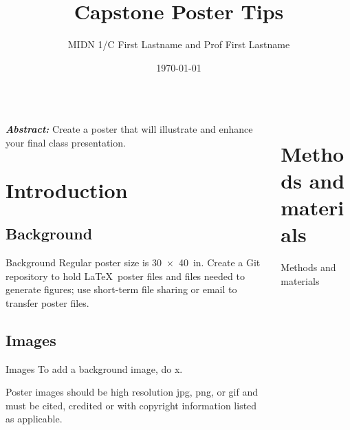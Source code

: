 \documentclass[pdf]{beamer}
\title{Capstone Poster Tips}
\author{MIDN 1/C First Lastname and Prof First Lastname}
\institute{Department of Weapons, Robotics, and Control Engineering}
\date{\today}
\begin{document}
\begin{frame}{}

\begin{columns}[T]

\begin{column}{0.25\textwidth}
\begin{block}{}
\textbf{\emph{Abstract:}} Create a poster that will illustrate and enhance your final class presentation.  
\end{block}

\section{Introduction}
\subsection{Background}
\begin{block}{Background}
Regular poster size is \SI{30x40}{in}. Create a Git repository to hold \LaTeX\ poster files and files needed to generate figures; use short-term file sharing or email to transfer poster files. 
\end{block}

\subsection{Images}
\begin{block}{Images}
To add a background image, do x.

Poster images should be high resolution jpg, png, or gif and must be cited, credited or with copyright information listed as applicable. 
\end{block}
\end{column}





\begin{column}{0.25\textwidth}
\section{Methods and materials}
\begin{block}{Methods and materials}


\end{block}
\end{column}
\end{columns}
\end{frame}
\end{document}
